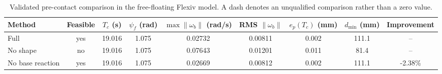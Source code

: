 \begin{table}[t]
\centering
\caption{Validated pre-contact comparison in the free-floating Flexiv model. A dash denotes an unqualified comparison rather than a zero value.}
\label{tab:precontact_comparison}
\begin{tabular}{lcccccccc}
\toprule
Method & Feasible & $T_c$ (s) & $\psi_f$ (rad) & $\max\|\omega_b\|$ (rad/s) & RMS $\|\omega_b\|$ & $e_p(T_c)$ (mm) & $d_{\min}$ (mm) & Improvement \\
\midrule
Full & yes & 19.016 & 1.075 & 0.02732 & 0.00811 & 0.002 & 111.1 & -- \\
No shape & no & 19.016 & 1.075 & 0.07643 & 0.01201 & 0.011 & 81.4 & -- \\
No base reaction & yes & 19.016 & 1.075 & 0.02669 & 0.00812 & 0.002 & 111.1 & -2.38\% \\
\bottomrule
\end{tabular}
\end{table}
